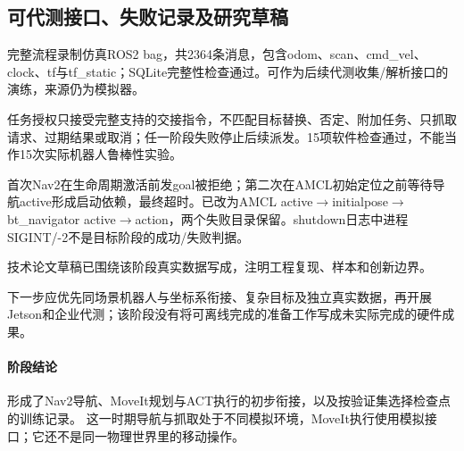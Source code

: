 
\subsection{可代测接口、失败记录及研究草稿}\label{s04-detail-6}

完整流程录制仿真ROS2 bag，共2364条消息，包含odom、scan、cmd\_vel、clock、tf与tf\_static；SQLite完整性检查通过。可作为后续代测收集/解析接口的演练，来源仍为模拟器。

任务授权只接受完整支持的交接指令，不匹配目标替换、否定、附加任务、只抓取请求、过期结果或取消；任一阶段失败停止后续派发。15项软件检查通过，不能当作15次实际机器人鲁棒性实验。

首次Nav2在生命周期激活前发goal被拒绝；第二次在AMCL初始定位之前等待导航active形成启动依赖，最终超时。已改为AMCL active\(\rightarrow\)initialpose\(\rightarrow\)bt\_navigator active\(\rightarrow\)action，两个失败目录保留。shutdown日志中进程SIGINT/-2不是目标阶段的成功/失败判据。

技术论文草稿已围绕该阶段真实数据写成，注明工程复现、样本和创新边界。

下一步应优先同场景机器人与坐标系衔接、复杂目标及独立真实数据，再开展Jetson和企业代测；该阶段没有将可离线完成的准备工作写成未实际完成的硬件成果。


\paragraph{阶段结论}形成了Nav2导航、MoveIt规划与ACT执行的初步衔接，以及按验证集选择检查点的训练记录。 这一时期导航与抓取处于不同模拟环境，MoveIt执行使用模拟接口；它还不是同一物理世界里的移动操作。


\FloatBarrier
